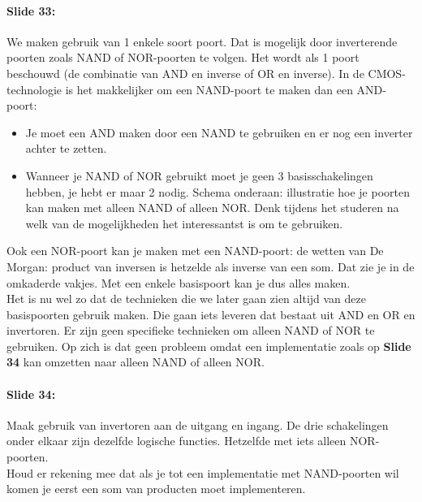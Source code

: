 \documentclass[10pt,a4paper]{book}
\begin{document}
\paragraph{Slide 33:} We maken gebruik van 1 enkele soort poort. Dat is mogelijk door inverterende poorten zoals NAND of NOR-poorten te volgen. Het wordt als 1 poort beschouwd (de combinatie van AND en inverse of OR en inverse). In de CMOS-technologie is het makkelijker om een NAND-poort te maken dan een AND-poort: 
\begin{itemize}
\item Je moet een AND maken door een NAND te gebruiken en er nog een inverter achter te zetten.
\item Wanneer je NAND of NOR gebruikt moet je geen 3 basisschakelingen hebben, je hebt er maar 2 nodig. Schema onderaan: illustratie hoe je poorten kan maken met alleen NAND of alleen NOR. Denk tijdens het studeren na welk van de mogelijkheden het interessantst is om te gebruiken. 
\end{itemize}
Ook een NOR-poort kan je maken met een NAND-poort: de wetten van De Morgan: product van inversen is hetzelde als inverse van een som. Dat zie je in de omkaderde vakjes. Met een enkele basispoort kan je dus alles maken.\\
Het is nu wel zo dat de technieken die we later gaan zien altijd van deze basispoorten gebruik maken. Die gaan iets leveren dat bestaat uit AND en OR en invertoren. Er zijn geen specifieke technieken om alleen NAND of NOR te gebruiken. Op zich is dat geen probleem omdat een implementatie zoals op \textbf{Slide 34} kan omzetten naar alleen NAND of alleen NOR. 

\paragraph{Slide 34:} Maak gebruik van invertoren aan de uitgang en ingang. De drie schakelingen onder elkaar zijn dezelfde logische functies. Hetzelfde met iets alleen NOR-poorten.\\
Houd er rekening mee dat als je tot een implementatie met NAND-poorten wil komen je eerst een som van producten moet implementeren. 
\end{document}
